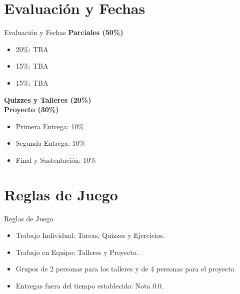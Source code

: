 \documentclass{beamer}
\begin{document}
\section{Evaluación y Fechas}

\begin{frame}{Evaluación y Fechas}
\textbf{Parciales (50\%)} 
\begin{itemize}
    \item 20\%: TBA
    \item 15\%: TBA
    \item 15\%: TBA
\end{itemize}
\textbf{Quizzes y Talleres (20\%)} \\
\textbf{Proyecto (30\%)} 
\begin{itemize}
    \item Primera Entrega: 10\%
    \item Segunda Entrega: 10\%
    \item Final y Sustentación: 10\%
\end{itemize}
\end{frame}

\section{Reglas de Juego}

\begin{frame}{Reglas de Juego}
\begin{itemize}
    \item Trabajo Individual: Tareas, Quizzes y Ejercicios.
    \item Trabajo en Equipo: Talleres y Proyecto.
    \item Grupos de 2 personas para los talleres y de 4 personas para el proyecto.
    \item Entregas fuera del tiempo establecido: Nota 0.0.
\end{itemize}
\end{frame}
\end{document}
